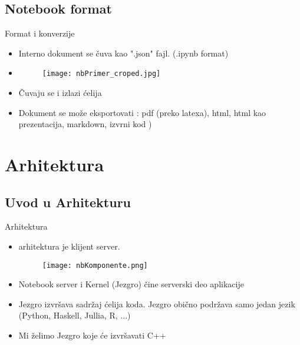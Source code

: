 \documentclass{beamer}
\begin{document}
\subsection{Notebook format}

\begin{frame}{Format i konverzije}
  \begin{itemize}
  \item {
      Interno dokument se čuva kao ".json" fajl.
      (.ipynb format) \pause 
  }
  \item{
    \begin{figure}[h!]
    \texttt{[image: nbPrimer\_croped.jpg]}
    \end{figure}
    \pause 
  }
  \item {
      Čuvaju se i izlazi ćelija \pause 
  }
  \item {   
      Dokument se može eksportovati : 
      {pdf (preko latexa)}, {html}, {html kao prezentacija},
       {markdown}, {izvrni kod}
      )
  }
  \end{itemize}
\end{frame}


\section {Arhitektura}

\subsection {Uvod u Arhitekturu}

\begin{frame}{Arhitektura}
\begin{itemize}
  \item{ arhitektura je klijent server. \pause 
          \begin{figure}[h!]
          \texttt{[image: nbKomponente.png]}
          \end{figure}
          \pause
        }
\item{ Notebook server i Kernel (Jezgro) čine serverski deo aplikacije \pause }
  \item { Jezgro izvršava sadržaj ćelija koda. Jezgro obično podržava
          samo jedan jezik (Python, Haskell, Jullia, R, ...) \pause }
  \item {Mi želimo Jezgro koje će izvršavati C++ }
\end{itemize}

\end{frame}
\end{document}
